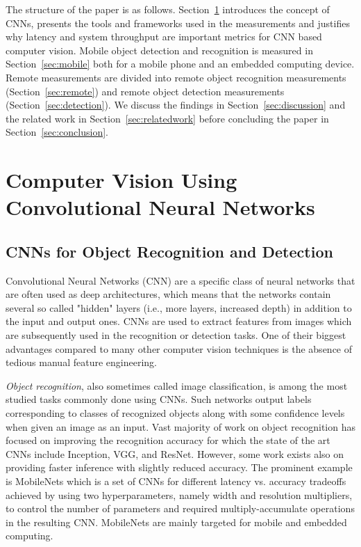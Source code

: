 \documentclass[sigconf]{acmart}
\begin{document}
The structure of the paper is as follows. Section~\ref{sec:background} introduces the concept of CNNs, presents the tools and frameworks used in the measurements and justifies why latency and system throughput are important metrics for CNN based computer vision. Mobile object detection and recognition is measured in Section~\ref{sec:mobile} both for a mobile phone and an embedded computing device. Remote measurements are divided into remote object recognition measurements (Section~\ref{sec:remote}) and remote object detection measurements (Section~\ref{sec:detection}). We discuss the findings in Section~\ref{sec:discussion} and the related work in Section~\ref{sec:relatedwork} before concluding the paper in Section~\ref{sec:conclusion}. %

\section{Computer Vision Using Convolutional Neural Networks}\label{sec:background}\subsection{CNNs for Object Recognition and Detection}

Convolutional Neural Networks (CNN) are a specific class of neural networks that are often used as deep architectures, which means that the networks contain several so called "hidden" layers (i.e., more layers, increased depth) in addition to the input and output ones.
CNNs are used to extract features from images which are subsequently used in the recognition or detection tasks. One of their biggest advantages compared to many other computer vision techniques is the absence of tedious manual feature engineering.

\textit{Object recognition}, also sometimes called image classification, is among the most studied tasks commonly done using CNNs. Such networks output labels corresponding to classes of recognized objects along with some confidence levels when given an image as an input. Vast majority of work on object recognition has focused on improving the recognition accuracy for which the state of the art CNNs include Inception\cite{Szegedy_2015_CVPR,pmlr-v37-ioffe15,Szegedy_2016_CVPR}, VGG, and ResNet. However, some work exists also on providing faster inference with slightly reduced accuracy. The prominent example is MobileNets\cite{howard17mobilenets} which is a set of CNNs for different latency vs. accuracy tradeoffs achieved by using two hyperparameters, namely width and resolution multipliers, to control the number of parameters and required multiply-accumulate operations in the resulting CNN. MobileNets are mainly targeted for mobile and embedded computing.
\end{document}
